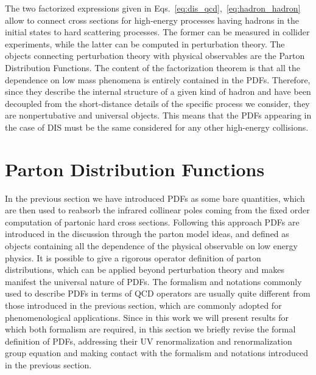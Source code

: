 %
The two factorized expressions given in Eqs.~\eqref{eq:dis_qcd},~\eqref{eq:hadron_hadron}
allow to connect cross sections for high-energy processes having hadrons in the initial states to hard scattering processes.
The former can be measured in collider experiments, while the latter 
can be computed in perturbation theory. The objects connecting perturbation theory with physical observables are
the Parton Distribution Functions.
The content of the factorization theorem is that all the dependence
on low mass phenomena is entirely contained in the PDFs. Therefore, since they describe the internal structure 
of a given kind of hadron and have been decoupled from the short-distance details of
the specific process we consider, they are nonpertubative and universal objects.
This means that the PDFs appearing in the case of DIS must be the same considered for 
any other high-energy collisions.

\section{Parton Distribution Functions}
In the previous section we have introduced PDFs as some bare quantities,
which are then used to reabsorb the infrared collinear poles coming from the fixed order computation of partonic
hard cross sections. Following this approach PDFs are introduced in the discussion through 
the parton model ideas, and defined as objects containing all the dependence 
of the physical observable on low energy physics. 
%
It is possible to give a rigorous operator definition of parton distributions,
which can be applied beyond perturbation theory and makes manifest the universal nature of PDFs.
The formalism and notations commonly used to describe PDFs in terms of QCD operators are usually quite different
from those introduced in the previous section, which are commonly adopted for phenomenological applications.
Since in this work we will present results for which both formalism are required,
in this section we briefly revise the formal definition of PDFs, addressing their UV renormalization
and renormalization group equation and making contact with the formalism and notations introduced in the previous section.

